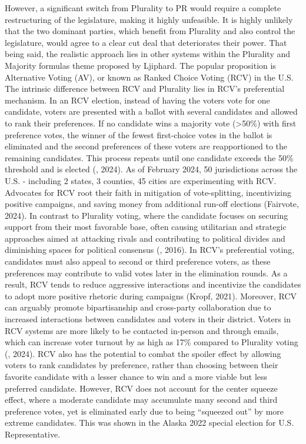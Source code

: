 However, a significant switch from Plurality to PR would require a complete restructuring of the legislature, making it highly unfeasible. It is highly unlikely that the two dominant parties, which benefit from Plurality and also control the legislature, would agree to a clear cut deal that deteriorates their power. That being said, the realistic approach lies in other systems within the Plurality and Majority formulas theme proposed by Ljiphard. The popular proposition is Alternative Voting (AV), or known as Ranked Choice Voting (RCV) in the U.S. The intrinsic difference between RCV and Plurality lies in RCV’s preferential mechanism. In an RCV election, instead of having the voters vote for one candidate, voters are presented with a ballot with several candidates and allowed to rank their preferences. If no candidate wins a majority vote (>50\%) with first preference votes, the winner of the fewest first-choice votes in the ballot is eliminated and the second preferences of these voters are reapportioned to the remaining candidates. This process repeats until one candidate exceeds the 50\% threshold and is elected (\cite{levy2024}, 2024). As of February 2024, 50 jurisdictions across the U.S. - including 2 states, 3 counties, 45 cities are experimenting with RCV. Advocates for RCV root their faith in mitigation of vote-splitting, incentivizing positive campaigns, and saving money from additional run-off elections (Fairvote, 2024). In contrast to Plurality voting, where the candidate focuses on securing support from their most favorable base, often causing utilitarian and strategic approaches aimed at attacking rivals and contributing to political divides and diminishing spaces for political consensus (\cite{donovan2016}, 2016). In RCV’s preferential voting, candidates must also appeal to second or third preference voters, as these preferences may contribute to valid votes later in the elimination rounds. As a result, RCV tends to reduce aggressive interactions and incentivize the candidates to adopt more positive rhetoric during campaigns (Kropf, 2021). Moreover, RCV can arguably promote bipartisanship and cross-party collaboration due to increased interactions between candidates and voters in their district. Voters in RCV systems are more likely to be contacted in-person and through emails, which can increase voter turnout by as high as 17\% compared to Plurality voting (\cite{dowling2024}, 2024). RCV also has the potential to combat the spoiler effect by allowing voters to rank candidates by preference, rather than choosing between their favorite candidate with a lesser chance to win and a more viable but less preferred candidate. However, RCV does not account for the center squeeze effect, where a moderate candidate may accumulate many second and third preference votes, yet is eliminated early due to being “squeezed out” by more extreme candidates. This was shown in the Alaska 2022 special election for U.S. Representative. 

